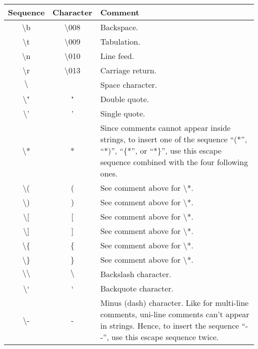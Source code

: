 \medskip
\noindent
\begin{tabular}{|c|c|p{7cm}|}
  \hline
  Sequence & Character & Comment \\
  \hline
  $\setminus$b & $\setminus$008 & Backspace. \\
  \hline
  $\setminus$t & $\setminus$009 & Tabulation. \\
  \hline
  $\setminus$n & $\setminus$010 & Line feed. \\
  \hline
  $\setminus$r & $\setminus$013 & Carriage return. \\
  \hline
  $\setminus$\textvisiblespace & \textvisiblespace      & Space character. \\
  \hline
  $\setminus$" & "              & Double quote. \\
  \hline
  $\setminus$' & '              & Single quote. \\
  \hline
  $\setminus$* & *              & Since comments cannot appear inside
                                  strings, to insert one of the
                                  sequence ``(*'', ``*)'', ``\{*'', or
                                  ``*\}'', use this escape sequence
                                  combined with the four following
                                  ones. \\
  \hline
  $\setminus$( & (              & See comment above for $\setminus$*. \\
  \hline
  $\setminus$) & )              & See comment above for $\setminus$*. \\
  \hline
  $\setminus$[ & [              & See comment above for $\setminus$*. \\
  \hline
  $\setminus$] & ]              & See comment above for $\setminus$*. \\
  \hline
  $\setminus$\{ & \{              & See comment above for $\setminus$*. \\
  \hline
  $\setminus$\} & \}              & See comment above for $\setminus$*. \\
  \hline
  $\setminus\setminus$ & $\setminus$      & Backslash character. \\
  \hline
  $\setminus$` & `      & Backquote character. \\
  \hline
  $\setminus$\-- & \-- & Minus (dash) character. Like for multi-line
                           comments, uni-line comments can't appear in
                           strings. Hence, to insert the sequence
                           ``\--\--'', use this escape sequence twice. \\

\end{tabular}
